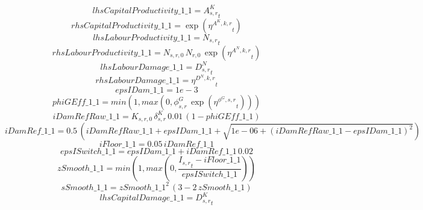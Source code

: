 \begin{dmath*}
lhsCapitalProductivity\_1\_1 = {{A^{K}_{s,r}}}_{t}
\end{dmath*}
\begin{dmath*}
rhsCapitalProductivity\_1\_1 = \exp\left({{\eta^{A^{K},k,r}}}_{t}\right)
\end{dmath*}
\begin{dmath*}
lhsLabourProductivity\_1\_1 = {{N_{s,r}}}_{t}
\end{dmath*}
\begin{dmath*}
rhsLabourProductivity\_1\_1 = {{N_{s,r,0}}}\, {{N_{r,0}}}\, \exp\left({{\eta^{A^{N},k,r}}}_{t}\right)
\end{dmath*}
\begin{dmath*}
lhsLabourDamage\_1\_1 = {{D^N_{s,r}}}_{t}
\end{dmath*}
\begin{dmath*}
rhsLabourDamage\_1\_1 = {{\eta^{D^{N},k,r}}}_{t}
\end{dmath*}
\begin{dmath*}
epsIDam\_1\_1 = 1e-3
\end{dmath*}
\begin{dmath*}
phiGEff\_1\_1 = min(1,max(0,{{\phi^{G}_{s,r}}}\, \exp\left({{\eta^{\phi^{G},s,r}}}_{t}\right)))
\end{dmath*}
\begin{dmath*}
iDamRefRaw\_1\_1 = {{K_{s,r,0}}}\, {{\delta^{K}_{s,r}}}\, 0.01\, \left(1-{phiGEff\_1\_1}\right)
\end{dmath*}
\begin{dmath*}
iDamRef\_1\_1 = 0.5\, \left({iDamRefRaw\_1\_1}+{epsIDam\_1\_1}+\sqrt{1e-06+\left({iDamRefRaw\_1\_1}-{epsIDam\_1\_1}\right)^{2}}\right)
\end{dmath*}
\begin{dmath*}
iFloor\_1\_1 = 0.05\, {iDamRef\_1\_1}
\end{dmath*}
\begin{dmath*}
epsISwitch\_1\_1 = {epsIDam\_1\_1}+{iDamRef\_1\_1}\, 0.02
\end{dmath*}
\begin{dmath*}
zSmooth\_1\_1 = min(1,max(0,\frac{{{I_{s,r}}}_{t}-{iFloor\_1\_1}}{{epsISwitch\_1\_1}}))
\end{dmath*}
\begin{dmath*}
sSmooth\_1\_1 = {zSmooth\_1\_1}^{2}\, \left(3-2\, {zSmooth\_1\_1}\right)
\end{dmath*}
\begin{dmath*}
lhsCapitalDamage\_1\_1 = {{D^K_{s,r}}}_{t}
\end{dmath*}
